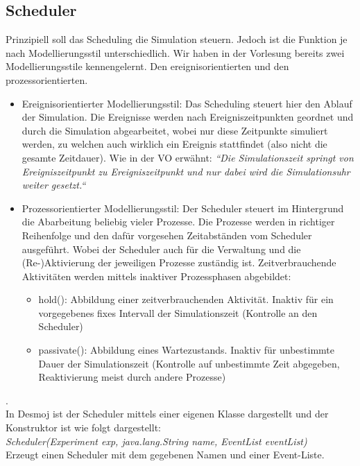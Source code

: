 \documentclass[runningheads]{llncs}
\begin{document}
\subsection{Scheduler}
Prinzipiell soll das Scheduling die Simulation steuern. Jedoch ist die Funktion je nach Modellierungsstil unterschiedlich. Wir haben in der Vorlesung bereits zwei Modellierungsstile kennengelernt. Den ereignisorientierten und den prozessorientierten. \\
\begin{itemize}
\item Ereignisorientierter Modellierungsstil: Das Scheduling steuert hier den Ablauf der Simulation. Die Ereignisse werden nach Ereigniszeitpunkten geordnet und durch die Simulation abgearbeitet, wobei nur diese Zeitpunkte simuliert werden, zu welchen auch wirklich ein Ereignis stattfindet (also nicht die gesamte Zeitdauer). Wie in der VO erwähnt: \textit{“Die Simulationszeit springt von Ereigniszeitpunkt zu Ereigniszeitpunkt und nur dabei wird die Simulationsuhr weiter gesetzt.“}
\item Prozessorientierter Modellierungsstil: Der Scheduler steuert im Hintergrund die Abarbeitung beliebig vieler Prozesse. Die Prozesse werden in richtiger Reihenfolge und den dafür vorgesehen Zeitabständen vom Scheduler ausgeführt. Wobei der Scheduler auch für die Verwaltung und die (Re-)Aktivierung der jeweiligen Prozesse zuständig ist. Zeitverbrauchende Aktivitäten werden mittels inaktiver Prozessphasen abgebildet:
\begin{itemize}
\item hold(): Abbildung einer zeitverbrauchenden Aktivität. Inaktiv für ein vorgegebenes fixes Intervall der Simulationszeit (Kontrolle an den Scheduler)
\item passivate(): Abbildung eines Wartezustands. Inaktiv für unbestimmte Dauer der Simulationszeit (Kontrolle auf unbestimmte Zeit abgegeben, Reaktivierung meist durch andere Prozesse)
\end{itemize}
\end{itemize}
.\\
In Desmoj ist der Scheduler mittels einer eigenen Klasse dargestellt und der Konstruktor ist wie folgt dargestellt:\\
\textit{Scheduler(Experiment exp, java.lang.String name, EventList eventList)}\\
Erzeugt einen Scheduler mit dem gegebenen Namen und einer Event-Liste.\\
\end{document}
